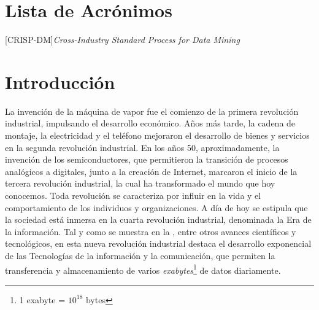 \documentclass[c5paper,10pt,twoside]{book}	   	%
\begin{document}
\tableofcontents  \listoffigures    

\chapter*{Lista de Acrónimos}

\begin{acronym}
	[CRISP-DM]{\emph{Cross-Industry Standard Process for Data Mining}}
\end{acronym}




\mainmatter

\pagestyle{fancy} \fancyhead[LE]{\changefont \thesection~\slshape \rightmark}
\fancyhead[RE]{}
\fancyhead[RO]{\changefont \chaptername~\thechapter\ \slshape \leftmark}
\fancyhead[LO]{}
\renewcommand{\chaptermark}[1]{\markboth{#1}{}}
\renewcommand{\sectionmark}[1]{\markright{#1}}


\lhead[\sc{Introducción}]{} 	\clearpage{}
{}
\acresetall
\chapter*{Introducción} \label{Intro}

La invención de la máquina de vapor fue el comienzo de la primera revolución industrial, impulsando el desarrollo económico. Años más tarde, la cadena de montaje, la electricidad y el teléfono mejoraron el desarrollo de bienes y servicios en la segunda revolución industrial. En los años 50, aproximadamente, la invención de los semiconductores, que permitieron la transición de procesos analógicos a digitales, junto a la creación de Internet, marcaron el inicio de la tercera revolución industrial, la cual ha transformado el mundo que hoy conocemos. Toda revolución se caracteriza por influir en la vida y el comportamiento de los individuos y organizaciones. A día de hoy se estipula que la sociedad está inmersa en la cuarta revolución industrial, denominada la Era de la información. Tal y como se muestra en la , entre otros avances científicos y tecnológicos, en esta nueva revolución industrial destaca el desarrollo exponencial de las Tecnologías de la información y la comunicación, que permiten la transferencia y almacenamiento de varios \textit{exabytes}\footnote{1 exabyte = $10^{18}$ bytes} de datos diariamente. 
\end{document}
